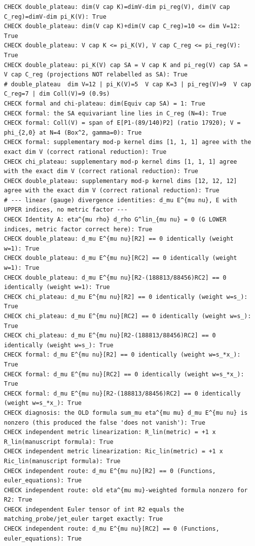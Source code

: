 \documentclass{article}
\theoremstyle{remark}
\begin{document}
\begin{lstlisting}
CHECK double_plateau: dim(V cap K)=dimV-dim pi_reg(V), dim(V cap C_reg)=dimV-dim pi_K(V): True
CHECK double_plateau: dim(V cap K)+dim(V cap C_reg)=10 <= dim V=12: True
CHECK double_plateau: V cap K <= pi_K(V), V cap C_reg <= pi_reg(V): True
CHECK double_plateau: pi_K(V) cap SA = V cap K and pi_reg(V) cap SA = V cap C_reg (projections NOT relabelled as SA): True
# double_plateau  dim V=12 | pi_K(V)=5  V cap K=3 | pi_reg(V)=9  V cap C_reg=7 | dim Coll(V)=9 (0.9s)
CHECK formal and chi-plateau: dim(Equiv cap SA) = 1: True
CHECK formal: the SA equivariant line lies in C_reg (N=4): True
CHECK formal: Coll(V) = span of E[P1-(89/140)P2] (ratio 17920); V = phi_{2,0} at N=4 (Box^2, gamma=0): True
CHECK formal: supplementary mod-p kernel dims [1, 1, 1] agree with the exact dim V (correct rational reduction): True
CHECK chi_plateau: supplementary mod-p kernel dims [1, 1, 1] agree with the exact dim V (correct rational reduction): True
CHECK double_plateau: supplementary mod-p kernel dims [12, 12, 12] agree with the exact dim V (correct rational reduction): True
# --- linear (gauge) divergence identities: d_mu E^{mu nu}, E with UPPER indices, no metric factor ---
CHECK Identity A: eta^{mu rho} d_rho G^lin_{mu nu} = 0 (G LOWER indices, metric factor correct here): True
CHECK double_plateau: d_mu E^{mu nu}[R2] == 0 identically (weight w=1): True
CHECK double_plateau: d_mu E^{mu nu}[RC2] == 0 identically (weight w=1): True
CHECK double_plateau: d_mu E^{mu nu}[R2-(188813/88456)RC2] == 0 identically (weight w=1): True
CHECK chi_plateau: d_mu E^{mu nu}[R2] == 0 identically (weight w=s_): True
CHECK chi_plateau: d_mu E^{mu nu}[RC2] == 0 identically (weight w=s_): True
CHECK chi_plateau: d_mu E^{mu nu}[R2-(188813/88456)RC2] == 0 identically (weight w=s_): True
CHECK formal: d_mu E^{mu nu}[R2] == 0 identically (weight w=s_*x_): True
CHECK formal: d_mu E^{mu nu}[RC2] == 0 identically (weight w=s_*x_): True
CHECK formal: d_mu E^{mu nu}[R2-(188813/88456)RC2] == 0 identically (weight w=s_*x_): True
CHECK diagnosis: the OLD formula sum_mu eta^{mu mu} d_mu E^{mu nu} is nonzero (this produced the false 'does not vanish'): True
CHECK independent metric linearization: R_lin(metric) = +1 x R_lin(manuscript formula): True
CHECK independent metric linearization: Ric_lin(metric) = +1 x Ric_lin(manuscript formula): True
CHECK independent route: d_mu E^{mu nu}[R2] == 0 (Functions, euler_equations): True
CHECK independent route: old eta^{mu mu}-weighted formula nonzero for R2: True
CHECK independent Euler tensor of int R2 equals the matching_probe/jet_euler target exactly: True
CHECK independent route: d_mu E^{mu nu}[RC2] == 0 (Functions, euler_equations): True

\end{lstlisting}
\end{document}
